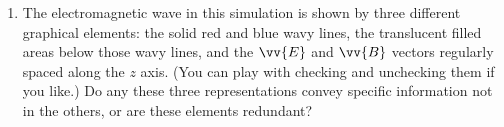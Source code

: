 \begin{enumerate}[labparts]
\item The electromagnetic wave in this simulation is shown by three different graphical elements: the solid red and blue wavy lines, the translucent filled areas below those wavy lines, and the $\vv {E}$ and $\vv {B}$ vectors regularly spaced along the $z$ axis.  (You can play with checking and unchecking them if you like.)  Do any these three representations convey specific information not in the others, or are these elements redundant?
\answerspace{10mm}
 

\end{enumerate}

